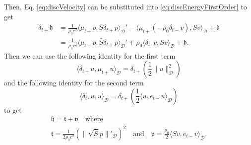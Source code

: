 \documentclass[dvipsnames]{article}
\begin{document}
Then, Eq. \eqref{eq:discVelocity} can be substituted into \eqref{eq:discEnergyFirstOrder} to get
\begin{align}
    \delta_{t+}\mathfrak{h} &= \frac{1}{\rho_0 c^2}\langle \mu_{t+}p, \bar S \delta_{t+}p \rangle_{\mathcal{D}}' -\langle \mu_{t+}(-\rho_0\delta_{t-}v), Sv\rangle_{\underline{\mathcal{D}}} + \mathfrak{b}\\
    &= \frac{1}{\rho_0 c^2}\langle \mu_{t+}p, \bar S \delta_{t+}p \rangle_{\mathcal{D}}' + \rho_0 \langle \delta_{t\cdot}v, Sv\rangle_{\underline{\mathcal{D}}} + \mathfrak{b}.
\end{align}
Then we can use the following identity for the first term
\begin{equation}
    \langle\delta_{t+}u, \mu_{t+}u\rangle_\mathcal{D} = \delta_{t+}\left(\frac{1}{2}\lVert u\rVert^2_\mathcal{D}\right)
\end{equation}
and the following identity for the second term
\begin{equation}
    \langle\delta_{t\cdot}u, u\rangle_\mathcal{D} = \delta_{t+}\left(\frac{1}{2}\langle u,e_{t-}u\rangle_\mathcal{D}\right)
\end{equation}
to get
\begin{equation}
    \begin{gathered}
        \mathfrak{h} = \mathfrak{t} + \mathfrak{v}\quad \text{where}\\
       \mathfrak{t} = \frac{1}{2\rho_0 c^2}\left(\lVert\sqrt{\bar S }p\rVert'_\mathcal{D}\right)^2\quad \text{and} \quad \mathfrak{v} = \frac{\rho_0}{2}\langle Sv, e_{t-}v\rangle_{\underline{\mathcal{D}}}.
    \end{gathered}
\end{equation}
\end{document}
